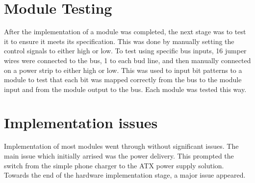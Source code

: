 \section{Module Testing}
After the implementation of a module was completed, the next stage was to test it to ensure
it meets its specification. This was done by manually setting the control signals to either high
or low. To test using specific bus inputs, 16 jumper wires were connected to the bus, 1 to each
bud line, and then manually connected on a power strip to either high or low. This was used
to input bit patterns to a module to test that each bit was mapped correctly from the bus to the
module input and from the module output to the bus. Each module was tested this way.

\section{Implementation issues}
Implementation of most modules went through without significant issues. The main issue which
initially arrised was the power delivery. This prompted the switch from the simple phone charger
to the ATX power supply solution. Towards the end of the hardware implementation stage, a major
issue appeared.
